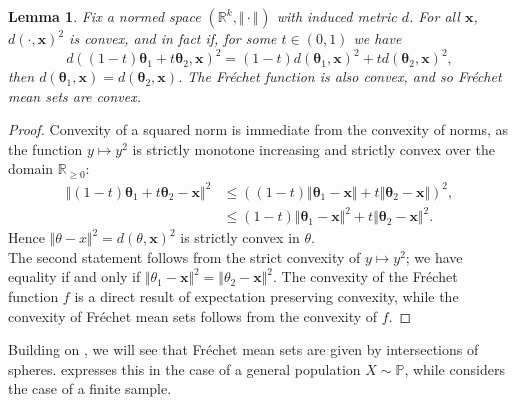 \documentclass[10pt]{article}
\newtheorem{lemma}[theorem]{Lemma}
\theoremstyle{definition}
\theoremstyle{remark}
\newcommand{\R}{\mathbb{R}}
\newcommand{\norm}[2]{\Vert #2 \Vert_{#1}}
\renewcommand{\vec}[1]{\mathbf{#1}}
\newcommand{\mb}[1]{\mathbb #1}
\begin{document}
	\begin{lemma}
		\label{lemma:NormConvexity}
		Fix a normed space $(\R^k, \norm{}{\cdot})$ with induced metric $d$. For all $\vec x$, $d(\cdot, \vec x)^2$ is convex, and in fact if, for some $t \in (0,1)$ we have $$d((1-t)\vec\theta_1 + t \vec\theta_2, \vec x)^2  = (1-t)d(\vec\theta_1, \vec x)^2+ t d(\vec\theta_2, \vec x)^2,$$ then $d(\vec\theta_1, \vec x) = d(\vec\theta_2, \vec x)$. The Fr\'echet function is also convex, and so Fr\'echet mean sets are convex.
	\end{lemma}
	\begin{proof}
		Convexity of a squared norm is immediate from the convexity of norms, as the function $y \mapsto y^2$ is strictly monotone increasing and strictly convex over the domain $\R_{\geq 0}$:
		\begin{align*}
			\Vert (1-t)\vec\theta_1 + t \vec\theta_2 - \vec x\Vert^2 &\leq \left( (1-t)\Vert \vec\theta_1 - \vec x \Vert + t \Vert \vec\theta_2 - \vec x\Vert \right)^2, \\
			&\leq (1-t)\Vert \vec \theta_1 - \vec x \Vert^2 + t \Vert \vec \theta_2 - \vec x\Vert^2.
		\end{align*}
		Hence $\Vert \theta - x\Vert^2 = d(\theta,\vec x)^2$ is strictly convex in $\theta$. \\
		The second statement follows from the strict convexity of $y \mapsto y^2$; we have equality if and only if $\Vert \theta_1 - \vec x \Vert^2 = \Vert \theta_2 - \vec x\Vert^2$. The convexity of the Fr\'echet function $f$ is a direct result of expectation preserving convexity, while the convexity of Fr\'echet mean sets follows from the convexity of $f$.
	\end{proof}
	
	Building on , we will see that Fr\'echet mean sets are given by intersections of spheres.  expresses this in the case of a general population $X \sim \mb P$, while  considers the case of a finite sample.
	
\end{document}
